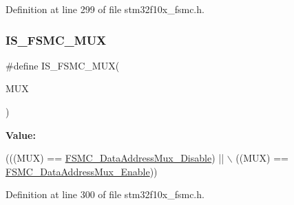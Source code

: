 Definition at line 299 of file stm32f10x\+\_\+fsmc.\+h.

\mbox{\label{group___f_s_m_c___data___address___bus___multiplexing_ga546fcab8c1b751b4a959ba2ce5b35d79}} 
\subsubsection{\texorpdfstring{I\+S\+\_\+\+F\+S\+M\+C\+\_\+\+M\+UX}{IS\_FSMC\_MUX}}
{\footnotesize\ttfamily \#define I\+S\+\_\+\+F\+S\+M\+C\+\_\+\+M\+UX(\begin{DoxyParamCaption}\item[{}]{M\+UX }\end{DoxyParamCaption})}

{\bfseries Value\+:}
\begin{DoxyCode}
(((MUX) == \hyperlink{group___f_s_m_c___data___address___bus___multiplexing_ga62d92adbcbcc1d6ec9a04de1b343744a}{FSMC\_DataAddressMux\_Disable}) || \(\backslash\)
                          ((MUX) == \hyperlink{group___f_s_m_c___data___address___bus___multiplexing_ga1dd4d12e63aaf29dbb8ae4b613f2aa15}{FSMC\_DataAddressMux\_Enable}))
\end{DoxyCode}


Definition at line 300 of file stm32f10x\+\_\+fsmc.\+h.

